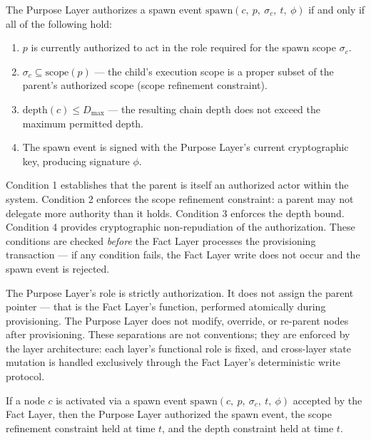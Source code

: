 \begin{dfn}
\label{dfn:spawn-authorization}
The Purpose Layer authorizes a spawn event $\mathrm{spawn}(c,\ p,\ \sigma_c,\ t,\ \phi)$ if and only if all of the following hold:
\begin{enumerate}
    \item $p$ is currently authorized to act in the role required for the spawn scope $\sigma_c$.
    \item $\sigma_c \subseteq \mathrm{scope}(p)$ — the child's execution scope is a proper subset of the parent's authorized scope (scope refinement constraint).
    \item $\mathrm{depth}(c) \leq D_{\max}$ — the resulting chain depth does not exceed the maximum permitted depth.
    \item The spawn event is signed with the Purpose Layer's current cryptographic key, producing signature $\phi$.
\end{enumerate}
\end{dfn}

Condition 1 establishes that the parent is itself an authorized actor within the system. Condition 2 enforces the scope refinement constraint: a parent may not delegate more authority than it holds. Condition 3 enforces the depth bound. Condition 4 provides cryptographic non-repudiation of the authorization. These conditions are checked \emph{before} the Fact Layer processes the provisioning transaction — if any condition fails, the Fact Layer write does not occur and the spawn event is rejected.

The Purpose Layer's role is strictly authorization. It does not assign the parent pointer — that is the Fact Layer's function, performed atomically during provisioning. The Purpose Layer does not modify, override, or re-parent nodes after provisioning. These separations are not conventions; they are enforced by the layer architecture: each layer's functional role is fixed, and cross-layer state mutation is handled exclusively through the Fact Layer's deterministic write protocol.

\begin{prop}
\label{prop:authorization-soundness}
If a node $c$ is activated via a spawn event $\mathrm{spawn}(c,\ p,\ \sigma_c,\ t,\ \phi)$ accepted by the Fact Layer, then the Purpose Layer authorized the spawn event, the scope refinement constraint held at time $t$, and the depth constraint held at time $t$.
\end{prop}

